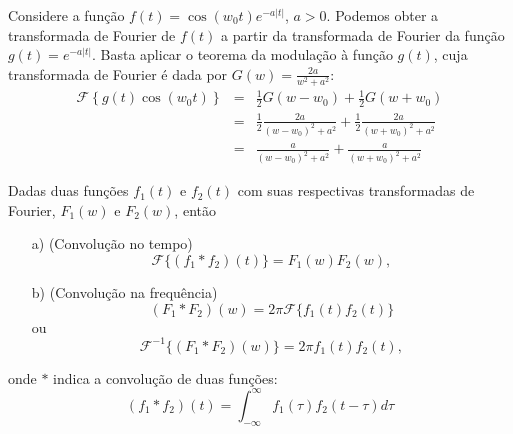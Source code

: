 \begin{ex}{\label{ex_prop_trans_1.0}}Considere a função $f(t)=\cos(w_0t) e^{-a|t|}$, $a>0$. Podemos obter a transformada de Fourier de $f(t)$ a partir da transformada de Fourier da função $g(t)=e^{-a|t|}$. Basta aplicar o teorema da modulação à função $g(t)$, cuja transformada de Fourier é dada por $G(w)=\frac{2a}{w^2+a^2}$:
\begin{eqnarray*}
\mathcal{F}\left\{g(t)\cos(w_0t) \right\}&=&\frac{1}{2}G(w-w_0)+\frac{1}{2}G(w+w_0)\\
&=&\frac{1}{2}\frac{2a}{(w-w_0)^2+a^2}+\frac{1}{2}\frac{2a}{(w+w_0)^2+a^2}\\
&=&\frac{a}{(w-w_0)^2+a^2}+\frac{a}{(w+w_0)^2+a^2}
\end{eqnarray*}
\end{ex}
\begin{teo} \label{prop_teo_conv} Dadas duas funções $f_1(t)$ e $f_2(t)$ com suas respectivas transformadas de Fourier, $F_1(w)$ e $F_2(w)$, então
\begin{itemize}
\item[a)] (Convolução no tempo)
\begin{equation}\mathcal{F}\{(f_1*f_2)(t)\}=F_1(w)F_2(w),\end{equation}
\item[b)] (Convolução na frequência)
\begin{equation}(F_1*F_2)(w)=2\pi\mathcal{F}\{f_1(t)f_2(t)\}\end{equation}
ou 
\begin{equation}\mathcal{F}^{-1}\{(F_1*F_2)(w)\}=2\pi f_1(t)f_2(t),\end{equation}
\end{itemize}
onde $*$ indica a convolução de duas funções:
\begin{equation}
(f_1*f_2)(t)=\int_{-\infty}^\infty f_1(\tau)f_2(t-\tau)d\tau
\end{equation}
\end{teo}

